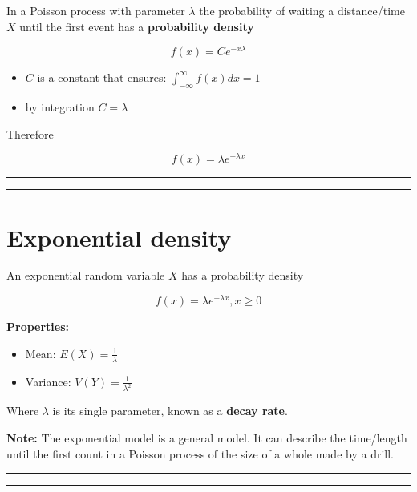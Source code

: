 \documentclass[
]{book}
\providecommand{\tightlist}{%
  \setlength{\itemsep}{0pt}\setlength{\parskip}{0pt}}
\begin{document}
In a Poisson process with parameter \(\lambda\) the probability of waiting a distance/time \(X\) until the first event has a \textbf{probability density}

\[f(x)= C e^{-x\lambda}\]

\begin{itemize}
\item
  \(C\) is a constant that ensures: \(\int_{-\infty}^{\infty} f(x) dx =1\)
\item
  by integration \(C=\lambda\)
\end{itemize}

Therefore

\[f(x)=\lambda e^{-\lambda x}\]

\begin{center}\rule{0.5\linewidth}{0.5pt}\end{center}

\begin{center}\rule{0.5\linewidth}{0.5pt}\end{center}

\hypertarget{exponential-density-3}{%
\section{Exponential density}\label{exponential-density-3}}

An exponential random variable \(X\) has a probability density

\[f(x)=\lambda e^{-\lambda x}, x\geq 0\]

\textbf{Properties:}

\begin{itemize}
\tightlist
\item
  Mean: \(E(X)=\frac{1}{\lambda}\)
\item
  Variance: \(V(Y)=\frac{1}{\lambda^2}\)
\end{itemize}

Where \(\lambda\) is its single parameter, known as a \textbf{decay rate}.

\textbf{Note:} The exponential model is a general model. It can describe the time/length until the first count in a Poisson process of the size of a whole made by a drill.

\begin{center}\rule{0.5\linewidth}{0.5pt}\end{center}

\begin{center}\rule{0.5\linewidth}{0.5pt}\end{center}
\end{document}
